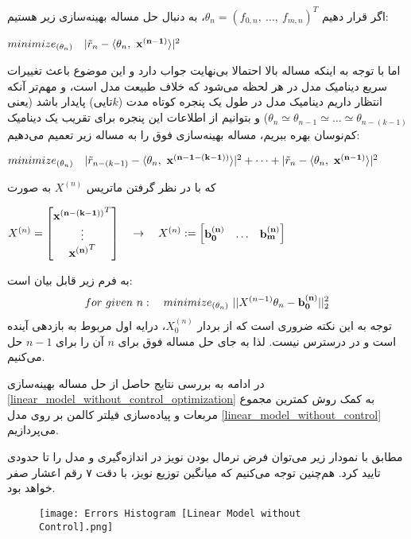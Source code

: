 \documentclass{scribe-cgenomics}
\begin{document}
اگر قرار دهیم
$\theta_n = (f_{0,n},\ \dots,\ f_{m, n})^T$،
به دنبال حل مساله بهینه‌سازی زیر هستیم:
\begin{center}
$minimize_{(\theta_n)}\quad |\tilde{r}_n - \langle\theta_n,\ \bold{x^{(n-1)}}\rangle |^2$
\end{center}
اما با توجه به اینکه مساله بالا احتمالا بی‌نهایت جواب دارد و این موضوع باعث تغییرات سریع دینامیک مدل در هر لحظه می‌شود که خلاف طبیعت مدل است، و مهم‌تر آنکه انتظار داریم دینامیک مدل در طول یک پنجره کوتاه مدت
($k$تایی)
پایدار باشد (یعنی
$\theta_{n}\simeq \theta_{n-1} \simeq \dots \simeq \theta_{n-(k-1)}$) و بتوانیم از اطلاعات این پنجره برای تقریب یک دینامیک کم‌نوسان بهره ببریم، مساله بهینه‌سازی فوق را به مساله زیر تعمیم می‌دهیم:
\begin{center}
$minimize_{(\theta_n)} \quad |\tilde{r}_{n-(k-1)} - \langle\theta_{n},\ \bold{x^{(n-1-(k-1))}}\rangle |^2 + \dots + |\tilde{r}_n - \langle\theta_n,\ \bold{x^{(n-1)}}\rangle |^2$
\end{center}
که با در نظر گرفتن ماتریس
$X^{(n)}$
به صورت
\begin{center}
$
X^{(n)} = 
\begin{bmatrix}
\bold{x^{(n-(k-1))}}^T \\
\vdots \\
\bold{x^{(n)}}^T \\
\end{bmatrix}
\quad
\rightarrow
\quad
X^{(n)} :=
\begin{bmatrix}
\bold{b^{(n)}_0} & \dots & \bold{b^{(n)}_m}
\end{bmatrix}
$
\end{center}
به فرم زیر قابل بیان است:
\begin{equation}\label{linear_model_without_control_optimization}
for\ given\ n:\quad minimize_{(\theta_n)}\ ||X^{(n-1)}\theta_n - \bold{b^{(n)}_0}||_2^2
\end{equation}
توجه به این نکته ضروری است که از بردار
$X^{(n)}_0$،
درایه اول مربوط به بازدهی آینده است و در درسترس نیست. لذا به جای حل مساله فوق برای
$n$
آن را برای
$n-1$
حل می‌کنیم.

در ادامه به بررسی نتایج حاصل از حل مساله بهینه‌سازی
\ref{linear_model_without_control_optimization}
به کمک روش کمترین مجموع مربعات و پیاده‌سازی فیلتر کالمن بر روی مدل
\ref{linear_model_without_control}
می‌پردازیم.

\begin{مشاهده}
مطابق با نمودار زیر می‌توان فرض نرمال بودن نویز در اندازه‌گیری و مدل را تا حدودی تایید کرد. هم‌چنین توجه می‌کنیم که میانگین توزیع نویز، با دقت ۷ رقم اعشار صفر خواهد بود.

\begin{figure}[h]
\texttt{[image: Errors Histogram [Linear Model without Control].png]}
\centering
\end{figure}
\end{مشاهده}
\end{document}
